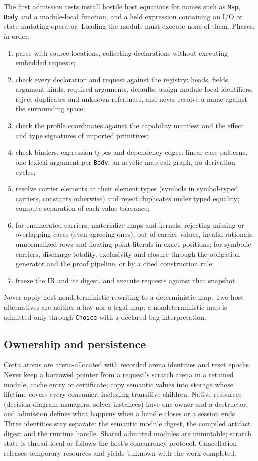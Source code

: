 \documentclass[11pt]{article}
\newcommand{\code}[1]{\texttt{#1}}
\begin{document}
The first admission tests install hostile host equations for names such as \code{Map}, \code{Body} and a
module-local function, and a held expression containing an I/O or state-mutating operator. Loading the
module must execute none of them. Phases, in order:
\begin{enumerate}
\item parse with source locations, collecting declarations without executing embedded requests;
\item check every declaration and request against the registry: heads, fields, argument kinds,
required arguments, defaults; assign module-local identifiers; reject duplicates and unknown
references, and never resolve a name against the surrounding space;
\item check the profile coordinates against the capability manifest and the effect and type
signatures of imported primitives;
\item check binders, expression types and dependency edges: linear case patterns, one lexical
argument per \code{Body}, an acyclic map-call graph, no derivation cycles;
\item resolve carrier elements at their element types (symbols in symbol-typed carriers, constants
otherwise) and reject duplicates under typed equality; compute separation of each value tolerance;
\item for enumerated carriers, materialize maps and kernels, rejecting missing or overlapping cases
(even agreeing ones), out-of-carrier values, invalid rationals, unnormalized rows and floating-point
literals in exact positions; for symbolic carriers, discharge totality, exclusivity and closure
through the obligation generator and the proof pipeline, or by a cited construction rule;
\item freeze the IR and its digest, and execute requests against that snapshot.
\end{enumerate}
Never apply host nondeterministic rewriting to a deterministic map. Two host alternatives are neither
a law nor a legal map; a nondeterministic map is admitted only through \code{Choice} with a declared
bag interpretation.

\subsection{Ownership and persistence}

Cetta atoms are arena-allocated with recorded arena identities and reset epochs. Never keep a
borrowed pointer from a request's scratch arena in a retained module, cache entry or certificate;
copy semantic values into storage whose lifetime covers every consumer, including transitive
children. Native resources (decision-diagram managers, solver instances) have one owner and a
destructor, and admission defines what happens when a handle closes or a session ends. Three
identities stay separate: the semantic module digest, the compiled artifact digest and the runtime
handle. Shared admitted modules are immutable; scratch state is thread-local or follows the host's
concurrency protocol. Cancellation releases temporary resources and yields Unknown with the work
completed.
\end{document}

